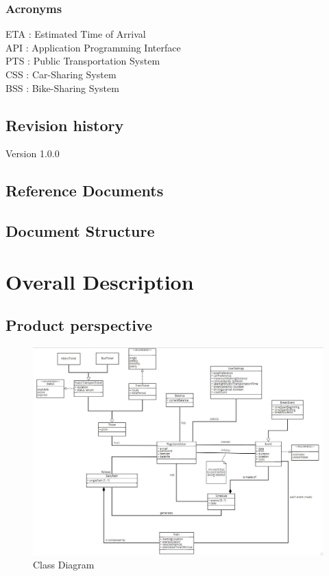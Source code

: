 \documentclass{article}
\begin{document}
\subsubsection{Acronyms}
ETA : Estimated Time of Arrival\\ API : Application Programming Interface\\ PTS : Public Transportation System\\ CSS : Car-Sharing System\\ BSS : Bike-Sharing System
\subsection{Revision history}
Version 1.0.0
\subsection{Reference Documents}

\subsection{Document Structure}
\section{Overall Description}
\subsection{Product perspective}
\begin{figure}[H]
\includegraphics[width=\linewidth]{Class_Diagram}
\caption{Class Diagram}
\label{fig:CD}
\end{figure}
\end{document}
